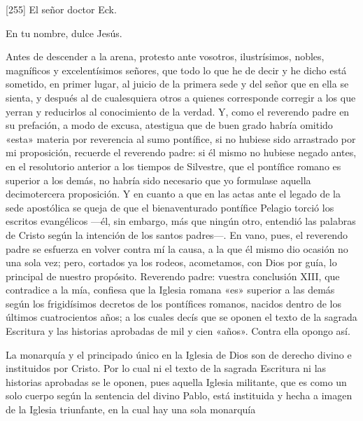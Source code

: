 [255] El señor doctor Eck.

En tu nombre, dulce Jesús.

Antes de descender a la arena, protesto ante vosotros, ilustrísimos, nobles, magníficos y excelentísimos señores, que todo lo que he de decir y he dicho está sometido, en primer lugar, al juicio de la primera sede y del señor que en ella se sienta, y después al de cualesquiera otros a quienes corresponde corregir a los que yerran y reducirlos al conocimiento de la verdad. Y, como el reverendo padre en su prefación, a modo de excusa, atestigua que de buen grado habría omitido «esta» materia por reverencia al sumo pontífice, si no hubiese sido arrastrado por mi proposición, recuerde el reverendo padre: si él mismo no hubiese negado antes, en el resolutorio anterior a los tiempos de Silvestre, que el pontífice romano es superior a los demás, no habría sido necesario que yo formulase aquella decimotercera proposición. Y en cuanto a que en las actas ante el legado de la sede apostólica se queja de que el bienaventurado pontífice Pelagio torció los escritos evangélicos —él, sin embargo, más que ningún otro, entendió las palabras de Cristo según la intención de los santos padres—. En vano, pues, el reverendo padre se esfuerza en volver contra mí la causa, a la que él mismo dio ocasión no una sola vez; pero, cortados ya los rodeos, acometamos, con Dios por guía, lo principal de nuestro propósito. Reverendo padre: vuestra conclusión XIII, que contradice a la mía, confiesa que la Iglesia romana «es» superior a las demás según los frigidísimos decretos de los pontífices romanos, nacidos dentro de los últimos cuatrocientos años; a los cuales decís que se oponen el texto de la sagrada Escritura y las historias aprobadas de mil y cien «años». Contra ella opongo así.

La monarquía y el principado único en la Iglesia de Dios son de derecho divino e instituidos por Cristo. Por lo cual ni el texto de la sagrada Escritura ni las historias aprobadas se le oponen, pues aquella Iglesia militante, que es como un solo cuerpo según la sentencia del divino Pablo, está instituida y hecha a imagen de la Iglesia triunfante, en la cual hay una sola monarquía

